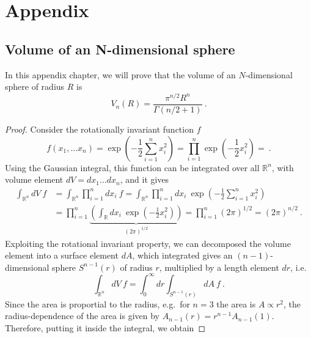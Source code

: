 \appendix

\part{Appendix}


\chapter{Volume of an N-dimensional sphere}

    In this appendix chapter, we will prove that the volume of an $N$-dimensional sphere of radius $R$ is 
    \begin{equation}\label{app:volumen}
        V_n (R) = \frac{\pi^{n/2} R^n}{\Gamma(n/2 + 1)} ~.
    \end{equation}
    \begin{proof}
        Consider the rotationally invariant function $f$ 
        \begin{equation*}
            f(x_1, \ldots x_n) = \exp(- \frac{1}{2} \sum_{i=1}^{n} x_i^2 ) = \prod_{i=1}^{n} \exp(- \frac{1}{2} x_i^2 ) =~.
        \end{equation*}
        Using the Gaussian integral, this function can be integrated over all $\mathbb R^n$, with volume element $dV = dx_1 \ldots dx_n$, and it gives
        \begin{equation*}
        \begin{aligned}
            \int_{\mathbb R^n} dV ~ f & = \int_{\mathbb R^n} \prod_{i=1}^n dx_i ~ f = \int_{\mathbb R^n} \prod_{i=1}^n dx_i ~ \exp(- \frac{1}{2} \sum_{i=1}^{n} x_i^2 ) \\ & = \prod_{i=1}^{n} \underbrace{( \int_{\mathbb R} dx_i ~ \exp(- \frac{1}{2} x_i^2 ))}_{(2 \pi)^{1/2}} = \prod_{i=1}^{n} (2 \pi)^{1/2} = (2 \pi)^{n/2} ~.
        \end{aligned}
        \end{equation*}
        Exploiting the rotational invariant property, we can decomposed the volume element into a surface element $dA$, which integrated gives an $(n-1)$-dimensional sphere $S^{n-1} (r)$ of radius $r$, multiplied by a length element $dr$, i.e.
        \begin{equation*}
            \int_{\mathbb R^n} dV ~ f = \int_0^\infty dr \int_{S^{n-1} (r)} dA ~ f ~.
        \end{equation*}
        Since the area is proportial to the radius, e.g.~for $n=3$ the area is $A \propto r^2$, the radius-dependence of the area is given by $A_{n-1}(r) = r^{n-1} A_{n-1} (1)$. Therefore, putting it inside the integral, we obtain 

\end{proof}

